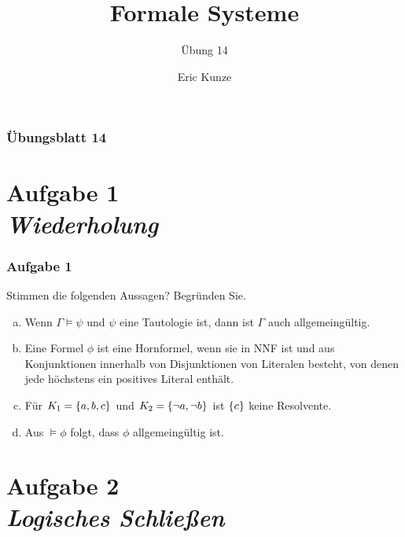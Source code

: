 \documentclass{beamer}
\begin{document}
	
	\title{Formale Systeme}
	\subtitle{Übung 14}
	\author{Eric Kunze}
	\date{}

	\maketitle


	\begin{frame} \frametitle{Übungsblatt 14}
		\tableofcontents
	\end{frame}

	
	\section{Aufgabe 1 \\ \itshape Wiederholung}
	
	
	\begin{frame} \frametitle{Aufgabe 1}
		Stimmen die folgenden Aussagen? Begründen Sie.
		\begin{enumerate}[a)]
			\item Wenn $\Gamma \models \psi$ und $\psi$ eine Tautologie ist, dann ist $\Gamma$ auch allgemeingültig.
			\item Eine Formel $\phi$ ist eine Hornformel, wenn sie in NNF ist und aus Konjunktionen innerhalb von Disjunktionen von Literalen besteht, von denen jede höchstens ein positives Literal enthält.
			\item Für $K_1 = \left\{ a, b, c \right\}$ und $K_2 = \left\{ \lnot a, \lnot b \right\}$ ist $\left\{ c \right\}$ keine Resolvente.
			\item Aus $\models \phi$ folgt, dass $\phi$ allgemeingültig ist.
		\end{enumerate}
	\end{frame}

	\section{Aufgabe 2 \\ \itshape Logisches Schließen}
\end{document}
